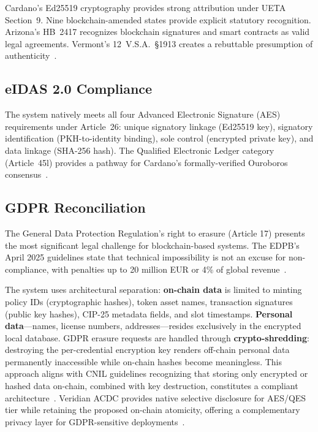 \documentclass[conference,10pt]{IEEEtran}
\begin{document}
Cardano's Ed25519 cryptography provides strong attribution under UETA Section~9. Nine blockchain-amended states provide explicit statutory recognition. Arizona's HB~2417 recognizes blockchain signatures and smart contracts as valid legal agreements. Vermont's 12~V.S.A.~\S1913 creates a rebuttable presumption of authenticity~\cite{arizona2017,vermont2016}.

\subsection{eIDAS 2.0 Compliance}

The system natively meets all four Advanced Electronic Signature (AES) requirements under Article~26: unique signatory linkage (Ed25519 key), signatory identification (PKH-to-identity binding), sole control (encrypted private key), and data linkage (SHA-256 hash). The Qualified Electronic Ledger category (Article~45l) provides a pathway for Cardano's formally-verified Ouroboros consensus~\cite{eidas2024}.

\subsection{GDPR Reconciliation}

The General Data Protection Regulation's right to erasure (Article 17) presents the most significant legal challenge for blockchain-based systems. The EDPB's April 2025 guidelines state that technical impossibility is not an excuse for non-compliance, with penalties up to 20 million EUR or 4\% of global revenue~\cite{edpb2025}.

The system uses architectural separation: \textbf{on-chain data} is limited to minting policy IDs (cryptographic hashes), token asset names, transaction signatures (public key hashes), CIP-25 metadata fields, and slot timestamps. \textbf{Personal data}---names, license numbers, addresses---resides exclusively in the encrypted local database. GDPR erasure requests are handled through \textbf{crypto-shredding}: destroying the per-credential encryption key renders off-chain personal data permanently inaccessible while on-chain hashes become meaningless. This approach aligns with CNIL guidelines recognizing that storing only encrypted or hashed data on-chain, combined with key destruction, constitutes a compliant architecture~\cite{cnil2018}. Veridian ACDC provides native selective disclosure for AES/QES tier while retaining the proposed on-chain atomicity, offering a complementary privacy layer for GDPR-sensitive deployments~\cite{veridian2025}.
\end{document}
